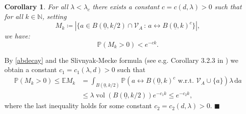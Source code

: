 \documentclass[11pt]{article}%
\newenvironment{proof}{\vspace{1ex}\noindent{\bf Proof.}}{\hspace*{\fill}$\blacksquare$\vspace{1ex}}
\newtheorem{corollary}[corollary]{Corollary}
\DeclareMathOperator{\vol}{vol}
\newcommand{\NN}{\mathbb{N}}
\newcommand{\Pro}{\mathbb{P}}
\newcommand{\Ex}{\mathbb{E}}
\newcommand{\typ}{\underline{0}}
\begin{document}
\begin{corollary}\label{abdecaycor}
	For all  $\lambda<\lambda_c$ there exists a constant $ c=c(d,\lambda)>0 $ such that 
	for all $ k\in\NN $, setting
	\begin{equation*}
		M_{k}\coloneqq|\{a\in B(\typ,k/2)\cap \mathcal{V}_A\,:\, a\longleftrightarrow  B(\typ,k)^c \}|,
	\end{equation*}
	we have:
	\begin{equation*}
		\Pro(M_{k}>0)<e^{-ck}.
	\end{equation*}
\end{corollary}

\begin{proof}
By \cref{abdecay} and the Slivnyak-Mecke formula (see e.g. Corollary 3.2.3 in \cite{schneider2008stochastic}) we obtain a constant $ c_1=c_1(\lambda,d)>0 $ such that
	\begin{equation*}
		\begin{split}
			\Pro(M_{k}>0)\leq \Ex M_k&=\int_{B(\typ,k/2)}\Pro(a\longleftrightarrow  B(\typ,k)^c\text{ w.r.t. }\mathcal{V}_A\cup\{a\})\lambda\,\text{d}a
			\\&\leq\lambda \vol(B(\typ,k/2)) e^{-c_1k}\leq e^{-c_2k},
		\end{split}
	\end{equation*}
where the last inequality holds for some constant $ c_2=c_2(d,\lambda)>0 $.
\end{proof}
\end{document}
